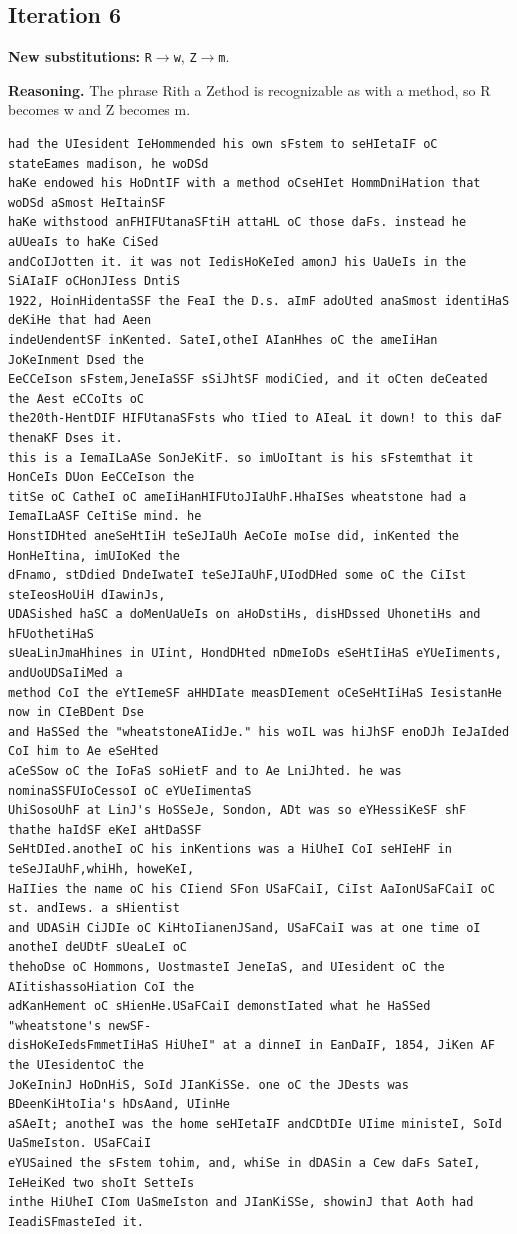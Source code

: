 \documentclass[12pt,a4paper]{article}
\begin{document}
\subsection{Iteration 6}

\noindent\textbf{New substitutions:} \texttt{R}$\rightarrow$\texttt{w}, \texttt{Z}$\rightarrow$\texttt{m}.\par
\smallskip
\noindent\textbf{Reasoning.} The phrase Rith a Zethod is recognizable as with a method, so R becomes w and Z becomes m.

\begin{lstlisting}[style=ciphertext,caption={Complete text after iteration 6}]
had the UIesident IeHommended his own sFstem to seHIetaIF oC stateEames madison, he woDSd
haKe endowed his HoDntIF with a method oCseHIet HommDniHation that woDSd aSmost HeItainSF
haKe withstood anFHIFUtanaSFtiH attaHL oC those daFs. instead he aUUeaIs to haKe CiSed
andCoIJotten it. it was not IedisHoKeIed amonJ his UaUeIs in the SiAIaIF oCHonJIess DntiS
1922, HoinHidentaSSF the FeaI the D.s. aImF adoUted anaSmost identiHaS deKiHe that had Aeen
indeUendentSF inKented. SateI,otheI AIanHhes oC the ameIiHan JoKeInment Dsed the
EeCCeIson sFstem,JeneIaSSF sSiJhtSF modiCied, and it oCten deCeated the Aest eCCoIts oC
the20th-HentDIF HIFUtanaSFsts who tIied to AIeaL it down! to this daF thenaKF Dses it.
this is a IemaILaASe SonJeKitF. so imUoItant is his sFstemthat it HonCeIs DUon EeCCeIson the
titSe oC CatheI oC ameIiHanHIFUtoJIaUhF.HhaISes wheatstone had a IemaILaASF CeItiSe mind. he
HonstIDHted aneSeHtIiH teSeJIaUh AeCoIe moIse did, inKented the HonHeItina, imUIoKed the
dFnamo, stDdied DndeIwateI teSeJIaUhF,UIodDHed some oC the CiIst steIeosHoUiH dIawinJs,
UDASished haSC a doMenUaUeIs on aHoDstiHs, disHDssed UhonetiHs and hFUothetiHaS
sUeaLinJmaHhines in UIint, HondDHted nDmeIoDs eSeHtIiHaS eYUeIiments, andUoUDSaIiMed a
method CoI the eYtIemeSF aHHDIate measDIement oCeSeHtIiHaS IesistanHe now in CIeBDent Dse
and HaSSed the "wheatstoneAIidJe." his woIL was hiJhSF enoDJh IeJaIded CoI him to Ae eSeHted
aCeSSow oC the IoFaS soHietF and to Ae LniJhted. he was nominaSSFUIoCessoI oC eYUeIimentaS
UhiSosoUhF at LinJ's HoSSeJe, Sondon, ADt was so eYHessiKeSF shF thathe haIdSF eKeI aHtDaSSF
SeHtDIed.anotheI oC his inKentions was a HiUheI CoI seHIeHF in teSeJIaUhF,whiHh, howeKeI,
HaIIies the name oC his CIiend SFon USaFCaiI, CiIst AaIonUSaFCaiI oC st. andIews. a sHientist
and UDASiH CiJDIe oC KiHtoIianenJSand, USaFCaiI was at one time oI anotheI deUDtF sUeaLeI oC
thehoDse oC Hommons, UostmasteI JeneIaS, and UIesident oC the AIitishassoHiation CoI the
adKanHement oC sHienHe.USaFCaiI demonstIated what he HaSSed "wheatstone's newSF-
disHoKeIedsFmmetIiHaS HiUheI" at a dinneI in EanDaIF, 1854, JiKen AF the UIesidentoC the
JoKeIninJ HoDnHiS, SoId JIanKiSSe. one oC the JDests was BDeenKiHtoIia's hDsAand, UIinHe
aSAeIt; anotheI was the home seHIetaIF andCDtDIe UIime ministeI, SoId UaSmeIston. USaFCaiI
eYUSained the sFstem tohim, and, whiSe in dDASin a Cew daFs SateI, IeHeiKed two shoIt SetteIs
inthe HiUheI CIom UaSmeIston and JIanKiSSe, showinJ that Aoth had IeadiSFmasteIed it.
\end{lstlisting}
\end{document}
